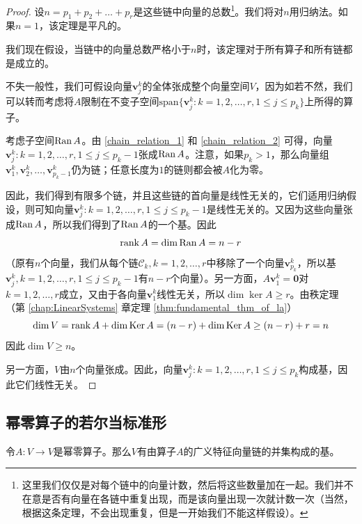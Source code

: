 \begin{proof}
    设$n=p_1+p_2+\dots+p_r$是这些链中向量的总数\footnote{这里我们仅仅是对每个链中的向量计数，然后将这些数量加在一起。我们并不在意是否有向量在各链中重复出现，而是该向量出现一次就计数一次（当然，根据这条定理，不会出现重复，但是一开始我们不能这样假设）。}。我们将对$n$用归纳法。如果$n=1$，该定理是平凡的。

    我们现在假设，当链中的向量总数严格小于$n$时，该定理对于所有算子和所有链都是成立的。

    不失一般性，我们可假设向量$\mathbf{v}_j^k$的全体张成整个向量空间$V$，因为如若不然，我们可以转而考虑将$A$限制在不变子空间$\mathrm{span}\{\mathbf{v}_{j}^{k}:k=1,2,\ldots,r,1\leq j\leq p_k\}$上所得的算子。

    考虑子空间$\operatorname{Ran} A$。由 \eqref{chain_relation_1} 和 \eqref{chain_relation_2} 可得，向量$\mathbf{v}_{j}^{k}:k=1,2,\ldots,r,$\linebreak $1\leq j\leq p_{k}-1$张成$\operatorname{Ran} A$。注意，如果$p_k>1$，那么向量组\linebreak $\mathbf{v}_{1}^{k},\mathbf{v}_{2}^{k},\ldots,\mathbf{v}_{p_{k}-1}^{k}$仍为链；任意长度为$1$的链则都会被$A$化为零。

    因此，我们得到有限多个链，并且这些链的首向量是线性无关的，它们适用归纳假设，则可知向量$\mathbf{v}_{j}^{k}:k=1,2,\ldots,r,1\leq j\leq p_{k}-1$是线性无关的。又因为这些向量张成$\operatorname{Ran} A$，所以我们得到了$\operatorname{Ran} A$的一个基。因此\[\operatorname{rank} A=\dim \operatorname{Ran} A=n-r\]
    （原有$n$个向量，我们从每个链$\mathcal{C}_k,k=1,2,\dots,r$中移除了一个向量$\mathbf{v}_{p_k}^k$，所以基$\mathbf{v}_{j}^{k},k=1,2,\ldots,r,1\leq j\leq p_{k}-1$有$n-r$个向量）。另一方面，$A\mathbf{v}_1^k=\mathbf{0}$对$k=1,2,\dots,r$成立，又由于各向量$\mathbf{v}_1^k$线性无关，所以$\dim\ker A\ge r$。由秩定理（第 \ref{chap:LinearSystems} 章定理 \ref{thm:fundamental_thm_of_la}）
    \[\dim V=\operatorname{rank} A+\dim \operatorname{Ker} A = (n-r)+\dim\operatorname{Ker} A\ge (n-r)+r=n\]
    因此$\dim V\ge n$。

    另一方面，$V$由$n$个向量张成。因此，向量$\mathbf{v}_{j}^{k}:k=1,2,\ldots,r,1\leq j\leq p_{k}$构成基，因此它们线性无关。
\end{proof}

\subsection{幂零算子的若尔当标准形}\label{subsec:jordan_nil}

\begin{theorem}\label{thm:basis_cycle_gen_eigen}
    令$A:V\to V$是幂零算子。那么$V$有由算子$A$的广义特征向量链的并集构成的基。
\end{theorem}

